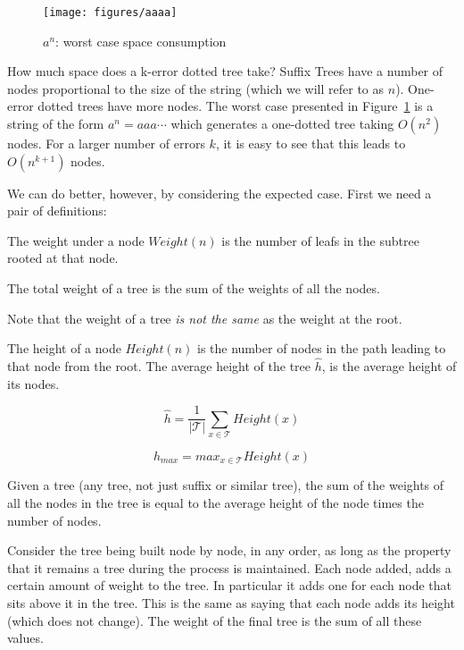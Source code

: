 \begin{figure}
\texttt{[image: figures/aaaa]}
\caption{$a^n$: worst case space consumption}%
\label{fig:aaaa}
\end{figure}

How much space does a k-error dotted tree take? Suffix Trees have a number of nodes proportional to the size of the string (which we will refer to as $n$). One-error dotted trees have more nodes. The worst case presented in Figure~\ref{fig:aaaa} is a string of the form $a^n = aaa\cdots$ which generates a one-dotted tree taking $O(n^2)$ nodes. For a larger number of errors $k$, it is easy to see that this leads to $O(n^{k+1})$ nodes.

We can do better, however, by considering the expected case. First we need a pair of definitions:

\begin{definition}
The weight under a node $\mathit{Weight}(n)$ is the number of leafs in the subtree rooted at that node.

The total weight of a tree is the sum of the weights of all the nodes.
\end{definition}

Note that the weight of a tree \emph{is not the same} as the weight at the root.

\begin{definition}
The height of a node $\mathit{Height}(n)$ is the number of nodes in the path leading to that node from the root. The average height of the tree $\hat{h}$, is the average height of its nodes.

\[ \hat{h} = \frac{1}{|\mathcal{T}|} \sum_{x \in \mathit{\mathcal{T}}} \mathit{Height}(x) \]

\[ h_{max} = \mathit{max}_{x \in \mathcal{T}} \mathit{Height}(x) \]

\end{definition}

\begin{lemma}
Given a tree (any tree, not just suffix or similar tree), the sum of the weights of all the nodes in the tree is equal to the average height of the node times the number of nodes.
\end{lemma}

\Proof
Consider the tree being built node by node, in any order, as long as the property that it remains a tree during the process is maintained. Each node added, adds a certain amount of weight to the tree. In particular it adds one for each node that sits above it in the tree. This is the same as saying that each node adds its height (which does not change). The weight of the final tree is the sum of all these values.

